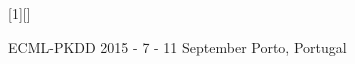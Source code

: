 \documentclass[xcolor={usenames,dvipsnames,svgnames}, compress]{beamer}
\begin{document}
\makeatletter
{}[1][]
{
  \begin{minipage}[t]{0.1\linewidth}
    \vspace{0pt}
    \ifdefined\@institutelogo
    \@institutelogo
    \fi
  \end{minipage}
  \begin{minipage}[t]{0.28\linewidth}
    \vspace{5pt}
    \flushleft
    {\insertinstitute\par}
    \vspace{2pt}
    \ifdefined\@department
    \tiny\@department
    \fi
  \end{minipage}
  \ifdefined\@laboratory
  \hspace{15pt}
  \begin{minipage}[t]{0.12\linewidth}
    \vspace{0pt}
    \ifdefined\@lablogo
    \@lablogo
    \else
    \hspace{10pt}
    \fi
  \end{minipage}
  \begin{minipage}[t]{0.40\linewidth}
    \vspace{5pt}
    \flushleft
    \tiny\textbf{\@laboratory}\par
    \vspace{2pt}
    \ifdefined\@group
    \@group
    \fi
  \end{minipage}
  \par
  \fi
  \vspace{10pt}
  
  \Large{}\inserttitle\par%
  \ifdefined\@subtitle
  \vspace{5pt}
  \small{}\textcolor{lacamlilac}{\insertsubtitle}\par
  \fi
  \vspace{15pt}
  \insertauthor\par
  
  \ifdefined\@gliph
  \vspace{7pt}
  \@gliph\par
  \vspace{7pt}
  \else
  \vspace{21pt}
  \fi

  {\vspace{-15pt} ECML-PKDD 2015} - { 7 - 11 September Porto, Portugal}
}
\makeatother
\end{document}
